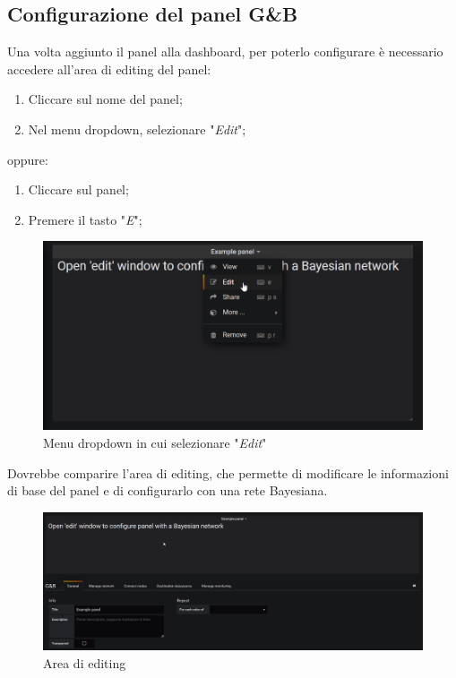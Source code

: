 \subsection{Configurazione del panel G\&B}
Una volta aggiunto il panel alla dashboard, per poterlo configurare è necessario accedere all'area di editing del panel:
\begin{enumerate}
	\item Cliccare sul nome del panel;
	\item Nel menu dropdown, selezionare "\textit{Edit}";
\end{enumerate}
oppure:
\begin{enumerate}
	\item Cliccare sul panel;
	\item Premere il tasto "\textit{E}";
\end{enumerate}
\begin{figure} [H]
	\centering
	\includegraphics[scale=0.55]{Img/editmode} 
	\caption{Menu dropdown in cui selezionare "\textit{Edit}"} \label{} 
\end{figure} 
Dovrebbe comparire l'area di editing, che permette di modificare le informazioni di base del panel e di configurarlo con una rete Bayesiana.
\begin{figure} [H]
	\centering
	\includegraphics[scale=0.55]{Img/editview} 
	\caption{Area di editing} \label{} 
\end{figure} 
